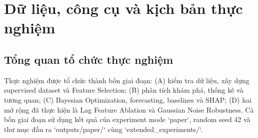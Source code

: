 \chapter{Dữ liệu, công cụ và kịch bản thực nghiệm}\label{chap:9}

\section{Tổng quan tổ chức thực nghiệm}\label{tux1ed5ng-quan-tux1ed5-chux1ee9c-thux1ef1c-nghiux1ec7m}

Thực nghiệm được tổ chức thành bốn giai đoạn: (A) kiểm tra dữ liệu, xây dựng supervised dataset và Feature Selection; (B) phân tích khám phá, thống kê và tương quan; (C) Bayesian Optimization, forecasting, baselines và SHAP; (D) hai mở rộng đã thực hiện là Lag Feature Ablation và Gaussian Noise Robustness. Cả bốn giai đoạn sử dụng kết quả của experiment mode `paper`, random seed 42 và thư mục đầu ra `outputs/paper/` cùng `extended\_experiments/`.

